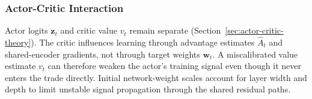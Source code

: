 \subsubsection{Actor-Critic Interaction}

Actor logits \(\mathbf z_t\) and critic value \(v_t\) remain separate (Section~\ref{sec:actor-critic-theory}). The critic influences learning through advantage estimates \(\hat A_t\) and shared-encoder gradients, not through target weights \(\mathbf w_t\). A miscalibrated value estimate \(v_t\) can therefore weaken the actor's training signal even though it never enters the trade directly. Initial network-weight scales account for layer width and depth to limit unstable signal propagation through the shared residual paths.
